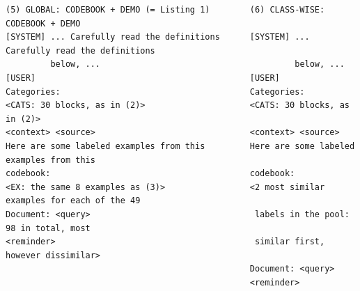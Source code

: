 \documentclass[11pt]{article}
\begin{document}
\begin{listing*}[tp]
\begin{lstlisting}
(5) GLOBAL: CODEBOOK + DEMO (= Listing 1)        (6) CLASS-WISE: CODEBOOK + DEMO
[SYSTEM] ... Carefully read the definitions      [SYSTEM] ... Carefully read the definitions
         below, ...                                       below, ...
[USER]                                           [USER]
Categories:                                      Categories:
<CATS: 30 blocks, as in (2)>                     <CATS: 30 blocks, as in (2)>
<context> <source>                               <context> <source>
Here are some labeled examples from this         Here are some labeled examples from this
codebook:                                        codebook:
<EX: the same 8 examples as (3)>                 <2 most similar examples for each of the 49
Document: <query>                                 labels in the pool: 98 in total, most
<reminder>                                        similar first, however dissimilar>
                                                 Document: <query>
                                                 <reminder>
\end{lstlisting}
\caption{All six prompt conditions for the same document; blocks shared with Listing~\ref{lst:prompt} are named rather than repeated. Between conditions only the label information and the one instruction sentence that names it change, and conditions 3, 4 and 5 share the same eight examples. Condition 3 never lists the valid labels: the only label names it shows are those on its examples and the two format examples in the closing reminder. The label list in conditions 1 and 4 is not de-duplicated, so the two labels with two codebook entries each appear twice.}
\label{lst:conditions}
\end{listing*}
\end{document}
